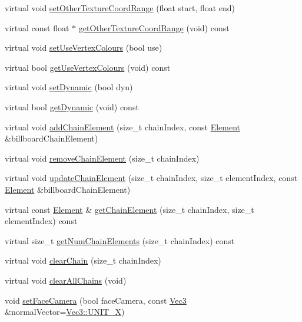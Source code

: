 \begin{DoxyCompactItemize}
\item 
virtual void \hyperlink{classPUBillboardChain_ae71162178b5886a93297766ea44079c4}{set\+Other\+Texture\+Coord\+Range} (float start, float end)
\item 
virtual const float $\ast$ \hyperlink{classPUBillboardChain_af17d5dd54f8ef5331ef2613ca937b199}{get\+Other\+Texture\+Coord\+Range} (void) const
\item 
virtual void \hyperlink{classPUBillboardChain_afe38aa42454cf7329ed5c9c4a808a4ad}{set\+Use\+Vertex\+Colours} (bool use)
\item 
virtual bool \hyperlink{classPUBillboardChain_adc396aa55a3e980a5d21cd5cbb28005a}{get\+Use\+Vertex\+Colours} (void) const
\item 
virtual void \hyperlink{classPUBillboardChain_abe44e442622bb8cbb1400ec34efb43d5}{set\+Dynamic} (bool dyn)
\item 
virtual bool \hyperlink{classPUBillboardChain_af302a78ee0a7e43f27c6b15c8851da64}{get\+Dynamic} (void) const
\item 
virtual void \hyperlink{classPUBillboardChain_aa83a2e0c9c0df5f9dbfe217e53a1dd60}{add\+Chain\+Element} (size\+\_\+t chain\+Index, const \hyperlink{classPUBillboardChain_1_1Element}{Element} \&billboard\+Chain\+Element)
\item 
virtual void \hyperlink{classPUBillboardChain_aa24788b7382cb562efa7504a6c1f5615}{remove\+Chain\+Element} (size\+\_\+t chain\+Index)
\item 
virtual void \hyperlink{classPUBillboardChain_a903a9a6a59673a296b10d52efc2656e8}{update\+Chain\+Element} (size\+\_\+t chain\+Index, size\+\_\+t element\+Index, const \hyperlink{classPUBillboardChain_1_1Element}{Element} \&billboard\+Chain\+Element)
\item 
virtual const \hyperlink{classPUBillboardChain_1_1Element}{Element} \& \hyperlink{classPUBillboardChain_a7ecf145713f707f5d75a796b11f2b3e9}{get\+Chain\+Element} (size\+\_\+t chain\+Index, size\+\_\+t element\+Index) const
\item 
virtual size\+\_\+t \hyperlink{classPUBillboardChain_ab5ca8f7f95aeb03147286666e7b40bef}{get\+Num\+Chain\+Elements} (size\+\_\+t chain\+Index) const
\item 
virtual void \hyperlink{classPUBillboardChain_a95dbb4b66dabb496bc3c9448e9e0a06f}{clear\+Chain} (size\+\_\+t chain\+Index)
\item 
virtual void \hyperlink{classPUBillboardChain_a19068a669deb9dbbca4bfe08ddd76073}{clear\+All\+Chains} (void)
\item 
void \hyperlink{classPUBillboardChain_a3cf5eab8b485ab9cafd87fd58623a288}{set\+Face\+Camera} (bool face\+Camera, const \hyperlink{classVec3}{Vec3} \&normal\+Vector=\hyperlink{classVec3_a859e21c0e95524033d5322f815127ff3}{Vec3\+::\+U\+N\+I\+T\+\_\+X})

\end{DoxyCompactItemize}
